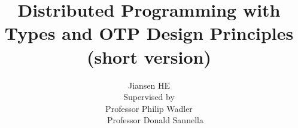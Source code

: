 \documentclass[coverpage]{myproposal}
\begin{document}
\title{Distributed Programming with Types and OTP Design Principles (short version)}
\author{ \hspace{2.8 cm} Jiansen HE \newline \\  Supervised by\\ Professor Philip Wadler \\ \ \ \ Professor Donald Sannella}
\maketitle








\end{document}
